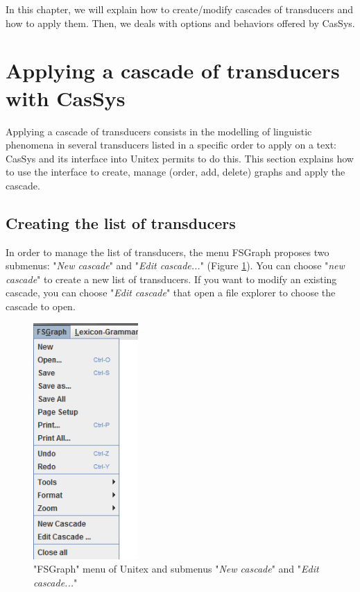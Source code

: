 \bigskip
\noindent  
In this chapter, we will explain how to create/modify cascades of transducers and how to apply them. Then, we deals with options and behaviors offered by CasSys.

\section{Applying a cascade of transducers with CasSys}
\label{section:applyCascade}
Applying a cascade of transducers consists in the modelling of linguistic phenomena in several transducers listed in a specific order to apply on a text: CasSys and its interface into Unitex permits to do this. This section explains how to use the interface to create, manage (order, add, delete) graphs and apply the cascade.   

\subsection{Creating the list of transducers}
\label{subsec:listTrans}

\bigskip
\noindent 
In order to manage the list of transducers, the menu FSGraph proposes two submenus: "\textit{New cascade}" and "\textit{Edit cascade...}" (Figure \ref{fig13-08}). You can choose "\textit{new cascade}" to create a new list of transducers. If you want to modify an existing cascade, you can choose "\textit{Edit cascade}" that open a file explorer to choose the cascade to open. 

\begin{figure}[!htb]
 \centering
 \includegraphics[width=4cm]{resources/img/fig13-08.png}
 \caption{"FSGraph" menu of Unitex and submenus "\textit{New cascade}" and "\textit{Edit cascade...}"}
 \label{fig13-08}
\end{figure}

